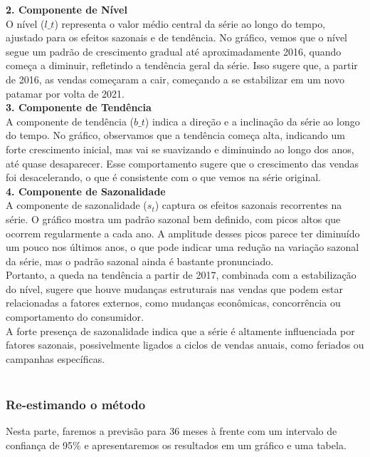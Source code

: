 \documentclass[a4paper, 12pt]{article}
\begin{document}
\textbf{2. Componente de Nível}\\
O nível ($l\_t$) representa o valor médio central da série ao longo do tempo, ajustado para os efeitos sazonais e de tendência. No gráfico, vemos que o nível segue um padrão de crescimento gradual até aproximadamente 2016, quando começa a diminuir, refletindo a tendência geral da série. Isso sugere que, a partir de 2016, as vendas começaram a cair, começando a se estabilizar em um novo patamar por volta de 2021.\\

\textbf{3. Componente de Tendência}\\
A componente de tendência ($b\_t$) indica a direção e a inclinação da série ao longo do tempo. No gráfico, observamos que a tendência começa alta, indicando um forte crescimento inicial, mas vai se suavizando e diminuindo ao longo dos anos, até quase desaparecer. Esse comportamento sugere que o crescimento das vendas foi desacelerando, o que é consistente com o que vemos na série original.\\

\textbf{4. Componente de Sazonalidade}\\
A componente de sazonalidade ($s_t$) captura os efeitos sazonais recorrentes na série. O gráfico mostra um padrão sazonal bem definido, com picos altos que ocorrem regularmente a cada ano. A amplitude desses picos parece ter diminuído um pouco nos últimos anos, o que pode indicar uma redução na variação sazonal da série, mas o padrão sazonal ainda é bastante pronunciado.\\

Portanto, a queda na tendência a partir de 2017, combinada com a estabilização do nível, sugere que houve mudanças estruturais nas vendas que podem estar relacionadas a fatores externos, como mudanças econômicas, concorrência ou comportamento do consumidor.\\
A forte presença de sazonalidade indica que a série é altamente influenciada por fatores sazonais, possivelmente ligados a ciclos de vendas anuais, como feriados ou campanhas específicas.\\\\

\subsubsection{Re-estimando o método}

Nesta parte, faremos a previsão para 36 meses à frente com um intervalo de confiança de 95\% e apresentaremos os resultados em um gráfico e uma tabela.\\
\end{document}
